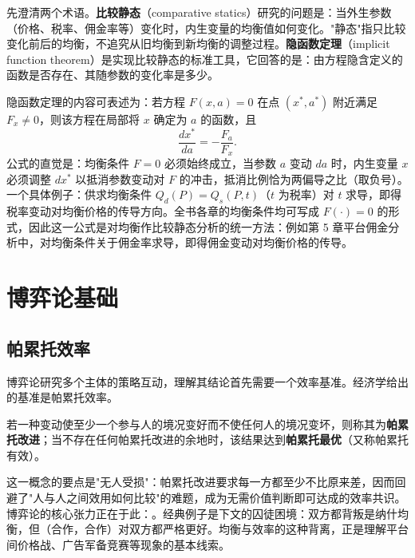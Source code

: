 先澄清两个术语。\textbf{比较静态}（comparative statics）研究的问题是：当外生参数（价格、税率、佣金率等）变化时，内生变量的均衡值如何变化。"静态"指只比较变化前后的均衡，不追究从旧均衡到新均衡的调整过程。\textbf{隐函数定理}（implicit function theorem）是实现比较静态的标准工具，它回答的是：由方程隐含定义的函数是否存在、其随参数的变化率是多少。

隐函数定理的内容可表述为：若方程 $F(x,a)=0$ 在点 $(x^*,a^*)$ 附近满足 $F_x \neq 0$，则该方程在局部将 $x$ 确定为 $a$ 的函数，且
\[
\frac{dx^*}{da} = -\frac{F_a}{F_x}.
\]
公式的直觉是：均衡条件 $F=0$ 必须始终成立，当参数 $a$ 变动 $da$ 时，内生变量 $x$ 必须调整 $dx^*$ 以抵消参数变动对 $F$ 的冲击，抵消比例恰为两偏导之比（取负号）。一个具体例子：供求均衡条件 $Q_d(P) = Q_s(P,t)$（$t$ 为税率）对 $t$ 求导，即得税率变动对均衡价格的传导方向。全书各章的均衡条件均可写成 $F(\cdot)=0$ 的形式，因此这一公式是对均衡作比较静态分析的统一方法：例如第 5 章平台佣金分析中，对均衡条件关于佣金率求导，即得佣金变动对均衡价格的传导。

\section{博弈论基础}

\subsection{帕累托效率}

博弈论研究多个主体的策略互动，理解其结论首先需要一个效率基准。经济学给出的基准是帕累托效率。

\begin{definition}
若一种变动使至少一个参与人的境况变好而不使任何人的境况变坏，则称其为\textbf{帕累托改进}；当不存在任何帕累托改进的余地时，该结果达到\textbf{帕累托最优}（又称帕累托有效）。
\end{definition}

这一概念的要点是"无人受损"：帕累托改进要求每一方都至少不比原来差，因而回避了"人与人之间效用如何比较"的难题，成为无需价值判断即可达成的效率共识。博弈论的核心张力正在于此：。经典例子是下文的囚徒困境：双方都背叛是纳什均衡，但（合作，合作）对双方都严格更好。均衡与效率的这种背离，正是理解平台间价格战、广告军备竞赛等现象的基本线索。

